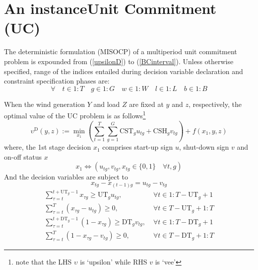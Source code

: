 \section{An instance\textemdash Unit Commitment (UC)}
The deterministic formulation (MISOCP) of a multiperiod unit commitment problem is expounded from (\ref{upsilonD}) to (\ref{BCinterval}).
Unless otherwise specified, range of the indices entailed during decision variable declaration and constraint specification phases are:
\[ \forall \quad t \in 1 \!:\! T \quad g \in 1 \!:\! G \quad w \in 1 \!:\! W \quad l \in 1 \!:\! L \quad b \in 1 \!:\! B \]

When the wind generation $Y$ and load $Z$ are fixed at $y$ and $z$, respectively, the optimal value of the UC problem is as follows\footnote{note that the LHS $\upsilon$ is \textquoteleft upsilon\textquoteright{} while RHS $v$ is \textquoteleft vee\textquoteright{}}
\begin{equation}\label{upsilonD}
    \upsilon^\textrm{D}(y, z) := \underset{x_1}{\min} \left(\sum_{t=1}^{T} \sum_{g=1}^{G} \mathrm{CST}_g u_{tg} + \mathrm{CSH}_g v_{tg}\right) + f(x_1, y, z)
\end{equation}
where, the 1st stage decision $x_1$ comprises start-up sign $u$, shut-down sign $v$ and on-off status $x$
\begin{equation}
    x_1 \iff \left( u_{tg}, v_{tg}, x_{tg} \in \{0, 1\} \quad \forall t, g \right)
\end{equation}
And the decision variables are subject to
\begin{equation}\label{logic2}
    x_{tg} - x_{(t-1)g} = u_{tg} - v_{tg}
\end{equation}
\begin{align}
    \sum_{\tau = t}^{t + \textrm{UT}_g - 1} x_{\tau g} \ge \textrm{UT}_g u_{tg}, \; &\forall t \in 1 \!:\! T-\textrm{UT}_g+1  \label{up_1} \\
    \sum_{\tau = t}^T (x_{\tau g} - u_{tg}) \ge 0, \; &\forall t \in T-\textrm{UT}_g+1 \!:\! T \label{up_2} \\
    \sum_{\tau = t}^{t + \textrm{DT}_g - 1} (1 - x_{\tau g}) \ge \textrm{DT}_g v_{tg}, \; &\forall t \in 1 \!:\! T-\textrm{DT}_g+1 \label{down_1} \\
    \sum_{\tau = t}^T (1 - x_{\tau g} - v_{tg}) \ge 0, \; &\forall t \in T-\textrm{DT}_g+1 \!:\! T \label{down_2}
\end{align}

